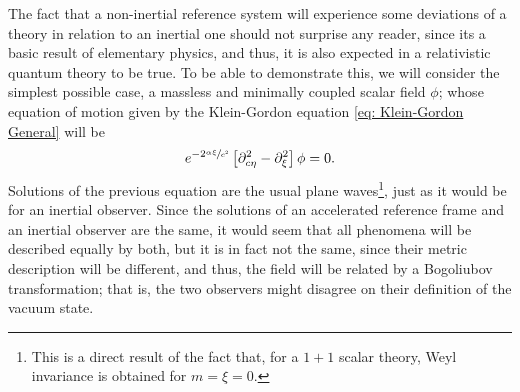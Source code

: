 The fact that a non-inertial reference system will experience some deviations of a theory in relation to an inertial one should not surprise any reader, since its a basic result of elementary physics, and thus, it is also expected in a relativistic quantum theory to be true. To be able to demonstrate this, we will consider the simplest possible case, a massless and minimally coupled scalar field $\phi$; whose equation of motion given by the Klein-Gordon equation \ref{eq: Klein-Gordon General} will be
\begin{equation}
	e^{-2\sfrac{\alpha\xi}{c^2}}\left[\partial^2_{c\eta}-\partial^2_\xi\right]\phi=0.
\end{equation}
Solutions of the previous equation are the usual plane waves\footnote{This is a direct result of the fact that, for a $1+1$ scalar theory, Weyl invariance is obtained for $m=\xi=0$.}, just as it would be for an inertial observer. Since the solutions of an accelerated reference frame and an inertial observer are the same, it would seem that all phenomena will be described equally by both, but it is in fact not the same, since their metric description will be different, and thus, the field will be related by a Bogoliubov transformation; that is, the two observers might disagree on their definition of the vacuum state.

